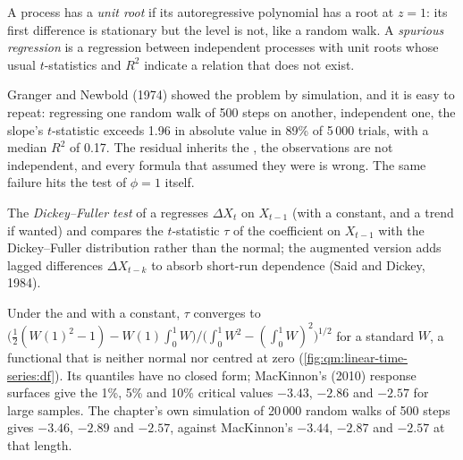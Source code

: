 \begin{definition}\label{def:qm:linear-time-series:unitroot}
A process has a \emph{unit root} if its autoregressive polynomial has a root at $z = 1$: its first difference is stationary but the level is
not, like a random walk. A \emph{spurious regression} is a regression between independent processes with unit roots whose usual
$t$-statistics and $R^2$ indicate a relation that does not exist.
\end{definition}

Granger and Newbold (1974) showed the problem by simulation, and it is easy to repeat: regressing one random walk of 500 steps on another,
independent one, the slope's $t$-statistic exceeds 1.96 in absolute value in 89\% of 5\,000 trials, with a median $R^2$ of 0.17. The residual
inherits the , the observations are not independent, and every formula that assumed they were is wrong. The same failure hits the
test of $\phi = 1$ itself.

\begin{definition}\label{def:qm:linear-time-series:df}
The \emph{Dickey--Fuller test} of a  regresses $\Delta X_t$ on $X_{t-1}$ (with a constant, and a trend if wanted) and
compares the $t$-statistic $\tau$ of the coefficient on $X_{t-1}$ with the Dickey--Fuller distribution rather than the normal; the augmented version
adds lagged differences $\Delta X_{t-k}$ to absorb short-run dependence (Said and Dickey, 1984).
\end{definition}

Under the  and with a constant, $\tau$ converges to $\bigl(\frac12(W(1)^2 - 1) - W(1)\int_0^1W\bigr)/\bigl(\int_0^1W^2 - (\int_0^1W)^2\bigr)^{1/2}$ for a
standard  $W$, a functional that is neither normal nor centred at zero (\cref{fig:qm:linear-time-series:df}). Its quantiles have no closed
form; MacKinnon's (2010) response surfaces give the 1\%, 5\% and 10\% critical values $-3.43$, $-2.86$ and $-2.57$ for large samples. The chapter's own
simulation of 20\,000 random walks of 500 steps gives $-3.46$, $-2.89$ and $-2.57$, against MacKinnon's $-3.44$, $-2.87$ and $-2.57$ at that length.

